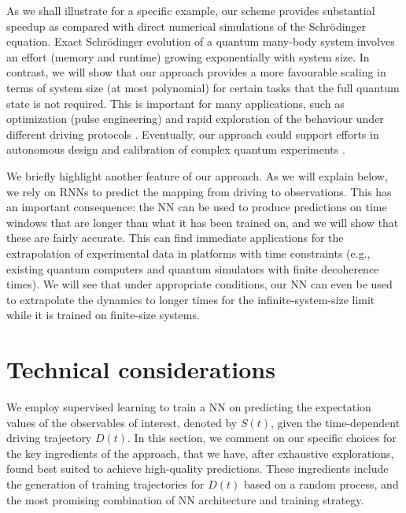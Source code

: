 \documentclass[a4paper,aps,amsmath,amssymb,twocolumn,longbibliography,,accepted=2022-05-17]{quantumarticle}
\begin{document}



As we shall illustrate for a specific example, our scheme provides substantial speedup as compared with direct numerical simulations of the Schr\"odinger equation. Exact Schr\"odinger evolution of a quantum many-body system involves an effort (memory and runtime) growing exponentially with system size.  In contrast, we will show that our approach provides a more favourable scaling in terms of system size (at most polynomial) for certain tasks that the full quantum state is not required. This is important for many applications, such as optimization (pulse engineering) and rapid exploration of the behaviour under different driving protocols \cite{PhysRevX.10.031002, PhysRevA.100.012103,RevModPhys.76.1037,RevModPhys.89.011004}.  Eventually, our approach could support efforts in autonomous design and calibration of complex quantum experiments \cite{melnikov2018active, moon2020machine}.

We briefly highlight another feature of our approach. As we will explain below, we rely on RNNs to predict the mapping from driving to observations. This has an important consequence: the NN can be used to produce predictions on time windows that are longer than what it has been trained on, and we will show that these are fairly accurate. This can find immediate applications for the extrapolation of experimental data in platforms with time constraints (e.g., existing quantum computers and quantum simulators with finite decoherence times). We will see that under appropriate conditions, our NN can even be used to extrapolate the dynamics to longer times for the infinite-system-size limit while it is trained on finite-size systems.



\section{Technical considerations \label{strategies}}


We employ supervised learning to train a NN on predicting the expectation values of the observables of interest, denoted by $S(t)$,  given the time-dependent driving trajectory $D(t)$. In this section, we comment on our specific choices for the key ingredients of the approach, that we have, after exhaustive explorations, found best suited to achieve high-quality predictions. These ingredients include the generation of training trajectories for $D(t)$ based on a random process, and the most promising combination of NN architecture and training strategy.
\end{document}
